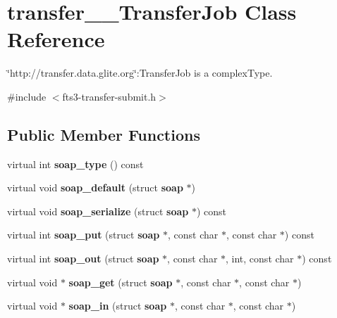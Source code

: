 \section{transfer\_\-\_\-TransferJob Class Reference}
\label{classtransfer____TransferJob}


\char`\"{}http://transfer.data.glite.org\char`\"{}:TransferJob is a complexType.  




{\ttfamily \#include $<$fts3-\/transfer-\/submit.h$>$}

\subsection*{Public Member Functions}
\begin{DoxyCompactItemize}
\item 
virtual int {\bfseries soap\_\-type} () const \label{classtransfer____TransferJob_a435d142b7c18238e1efb3f1e2553c7e5}

\item 
virtual void {\bfseries soap\_\-default} (struct {\bf soap} $\ast$)\label{classtransfer____TransferJob_a709cdcf0f5ac21e219020f72aa2498a8}

\item 
virtual void {\bfseries soap\_\-serialize} (struct {\bf soap} $\ast$) const \label{classtransfer____TransferJob_ab0d8968ea31382f572e017870ba77234}

\item 
virtual int {\bfseries soap\_\-put} (struct {\bf soap} $\ast$, const char $\ast$, const char $\ast$) const \label{classtransfer____TransferJob_aee1881a31b62fc13e8461379c980a50f}

\item 
virtual int {\bfseries soap\_\-out} (struct {\bf soap} $\ast$, const char $\ast$, int, const char $\ast$) const \label{classtransfer____TransferJob_af95447f3ca57713e4d4aebc2e97c1453}

\item 
virtual void $\ast$ {\bfseries soap\_\-get} (struct {\bf soap} $\ast$, const char $\ast$, const char $\ast$)\label{classtransfer____TransferJob_add525c689a6052cd88ccdaa60f18ce80}

\item 
virtual void $\ast$ {\bfseries soap\_\-in} (struct {\bf soap} $\ast$, const char $\ast$, const char $\ast$)\label{classtransfer____TransferJob_ad4e215786c4388bc92d129d593e73c08}

\end{DoxyCompactItemize}
